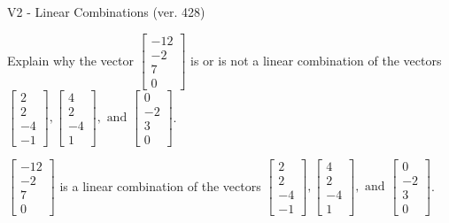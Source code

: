 \begin{exercise}
  \begin{exerciseTitle}V2 - Linear Combinations (ver. 428)\end{exerciseTitle}
  \begin{exerciseStatement}
    Explain why the vector \(\left[\begin{array}{c}
-12 \\
-2 \\
7 \\
0
\end{array}\right]\)  is or is not a linear 
	combination of the vectors \(\left[\begin{array}{c}
2 \\
2 \\
-4 \\
-1
\end{array}\right] , \left[\begin{array}{c}
4 \\
2 \\
-4 \\
1
\end{array}\right] , \text{ and } \left[\begin{array}{c}
0 \\
-2 \\
3 \\
0
\end{array}\right]\).
	


  \end{exerciseStatement}
  \begin{exerciseAnswer}
   \(\left[\begin{array}{c}
-12 \\
-2 \\
7 \\
0
\end{array}\right]\) 
  	 is  
	a linear combination of the vectors \(\left[\begin{array}{c}
2 \\
2 \\
-4 \\
-1
\end{array}\right] , \left[\begin{array}{c}
4 \\
2 \\
-4 \\
1
\end{array}\right] , \text{ and } \left[\begin{array}{c}
0 \\
-2 \\
3 \\
0
\end{array}\right]\).

	
  


  \end{exerciseAnswer}
\end{exercise}